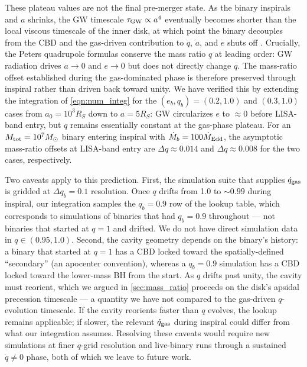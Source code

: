 \documentclass[fleqn,usenatbib]{mnras}
\begin{document}
These plateau values are not the final pre-merger state. As the binary inspirals and $a$ shrinks, the GW timescale $\tau_{\rm GW} \propto a^4$ \citep{peters_64} eventually becomes shorter than the local viscous timescale of the inner disk, at which point the binary decouples from the CBD and the gas-driven contribution to $\dot{q}$, $\dot{a}$, and $\dot{e}$ shuts off \citep{Milos+2005-decouple, farris_2015, dittmann_decouple, krauth2023b}. Crucially, the Peters quadrupole formulas conserve the mass ratio $q$ at leading order: GW radiation drives $a \to 0$ and $e \to 0$ but does not directly change $q$. The mass-ratio offset established during the gas-dominated phase is therefore preserved through inspiral rather than driven back toward unity. We have verified this by extending the integration of \autoref{eqn:num_integ} for the $(e_b, q_b) = (0.2, 1.0)$ and $(0.3, 1.0)$ cases from $a_0 = 10^3 R_S$ down to $a = 5 R_S$: GW circularizes $e$ to $\approx 0$ before LISA-band entry, but $q$ remains essentially constant at the gas-phase plateau. For an $M_{\rm tot} = 10^7 M_\odot$ binary entering inspiral with $\dot{M}_b = 100 \dot{M}_{\rm Edd}$, the asymptotic mass-ratio offsets at LISA-band entry are $\Delta q \approx 0.014$ and $\Delta q \approx 0.008$ for the two cases, respectively.

Two caveats apply to this prediction. First, the simulation suite that supplies $\dot{q}_{\rm gas}$ is gridded at $\Delta q_b = 0.1$ resolution. Once $q$ drifts from 1.0 to ${\sim}0.99$ during inspiral, our integration samples the $q_b = 0.9$ row of the lookup table, which corresponds to simulations of binaries that had $q_b = 0.9$ throughout --- not binaries that started at $q = 1$ and drifted. We do not have direct simulation data in $q \in (0.95, 1.0)$. Second, the cavity geometry depends on the binary's history: a binary that started at $q = 1$ has a CBD locked toward the spatially-defined ``secondary'' (an apocenter convention), whereas a $q_b = 0.9$ simulation has a CBD locked toward the lower-mass BH from the start. As $q$ drifts past unity, the cavity must reorient, which we argued in \autoref{sec:mass_ratio} proceeds on the disk's apsidal precession timescale --- a quantity we have not compared to the gas-driven $q$-evolution timescale. If the cavity reorients faster than $q$ evolves, the lookup remains applicable; if slower, the relevant $\dot{q}_{\rm gas}$ during inspiral could differ from what our integration assumes. Resolving these caveats would require new simulations at finer $q$-grid resolution and live-binary runs through a sustained $\dot{q} \neq 0$ phase, both of which we leave to future work.
\end{document}
